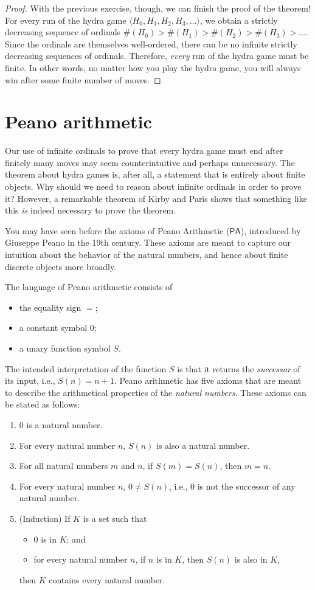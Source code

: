\documentclass[a4paper]{memoir}
\theoremstyle{definition}
\begin{document}
\begin{proof}
  With the previous exercise, though, we can finish the proof of the theorem! For every run 
  of the hydra game $\langle H_0, H_1, H_2, H_3, \ldots \rangle$, we obtain a strictly decreasing 
  sequence of ordinals $\#(H_0) > \#(H_1) > \#(H_2) > \#(H_3) > \ldots$. Since the ordinals are 
  themselves well-ordered, there can be no infinite strictly decreasing sequences of ordinals. 
  Therefore, \emph{every} run of the hydra game must be finite. In other words, no matter how you 
  play the hydra game, you will always win after some finite number of moves.
\end{proof}

\section{Peano arithmetic}

Our use of infinite ordinals to prove that every hydra game must end after finitely many moves 
may seem counterintuitive and perhaps unnecessary. The theorem about hydra games is, after all, 
a statement that is entirely about finite objects. Why should we need to reason about 
infinite ordinals in order to prove it? However, a remarkable theorem of Kirby and Paris shows 
that something like this \emph{is} indeed necessary to prove the theorem. 

You may have seen before the axioms of Peano Arithmetic ($\mathsf{PA}$), introduced by Giuseppe Peano in the 
19th century. These axioms are meant to capture our intuition about the behavior of the natural numbers, 
and hence about finite discrete objects more broadly. 

The language of Peano arithmetic consists of
\begin{itemize}
  \item the equality sign $=$;
  \item a constant symbol $0$;
  \item a unary function symbol $S$.
\end{itemize}
The intended interpretation of the function $S$ is that it returns the \emph{successor} of 
its input, i.e., $S(n) = n+1$. Peano arithmetic has five axioms that are meant to describe 
the arithmetical properties of the \emph{natural numbers}. These axioms can be stated as follows:
\begin{enumerate}
  \item $0$ is a natural number.
  \item For every natural number $n$, $S(n)$ is also a natural number.
  \item For all natural numbers $m$ and $n$, if $S(m) = S(n)$, then $m = n$.
  \item For every natural number $n$, $0 \neq S(n)$, i.e., $0$ is not the successor of any 
  natural number.
  \item (Induction) If $K$ is a set such that
  \begin{itemize}
    \item $0$ is in $K$; and
    \item for every natural number $n$, if $n$ is in $K$, then $S(n)$ is also in $K$,
  \end{itemize}
  then $K$ contains every natural number.
\end{enumerate}
\end{document}
